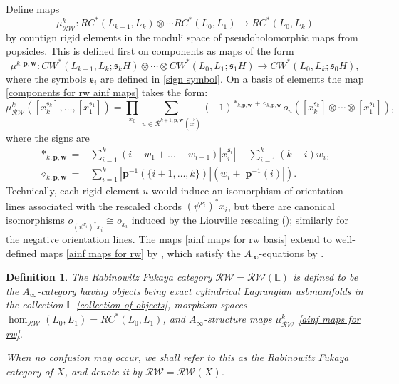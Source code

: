 \documentclass[11pt]{amsproc}
\def\L{{\mathbb L}}
\def\cR{\mathcal{R}}
\def\rw{\mathcal{RW}}
\def\ainf{A_\infty}
\def\sk{\mathfrak{s}}
\newtheorem{defn}[lem]{Definition}
\theoremstyle{remark}
\numberwithin{equation}{section}
\begin{document}
Define maps
\begin{equation}\label{ainf maps for rw}
\mu^{k}_{\rw}: RC^{*}(L_{k-1}, L_{k}) \otimes \cdots RC^{*}(L_{0}, L_{1}) \to RC^{*}(L_{0}, L_{k})
\end{equation}
by countign rigid elements in the moduli space of pseudoholomorphic maps from popsicles.
This is defined first on components as maps of the form
\begin{equation}\label{components for rw ainf maps}
\mu^{k, \mathbf{p}, \mathbf{w}}: CW^{*}(L_{k-1}, L_{k}; \sk_{k}H) \otimes \cdots \otimes CW^{*}(L_{0}, L_{1}; \sk_{1}H) \to CW^{*}(L_{0}, L_{k}; \sk_{0}H),
\end{equation}
where the symbols $\sk_{i}$ are defined in \eqref{sign symbol}.
On a basis of elements the map \eqref{components for rw ainf maps} takes the form:
\begin{equation}\label{ainf maps for rw basis}
\mu^{k}_{\rw}([x_{k}^{\sk_{k}}], \ldots, [x_{1}^{\sk_{1}}]) = \prod_{x_{0}} \sum_{u \in \cR^{k+1, \mathbf{p}, \mathbf{w}}(\vec{x})} (-1)^{*_{k, \mathbf{p}, \mathbf{w}} + \diamond_{k, \mathbf{p}, \mathbf{w}}} o_{u}([x_{k}^{\sk_{k}}] \otimes \cdots \otimes [x_{1}^{\sk_{1}}]),
\end{equation}
where the signs are
\begin{align}
*_{k, \mathbf{p}, \mathbf{w}} = & \sum_{i=1}^{k} (i + w_{1} + \ldots + w_{i-1}) |x_{i}^{\sk_{i}}| + \sum_{i=1}^{k} (k-i) w_{i}, \label{popsicle sign 1} \\
 \diamond_{k, \mathbf{p}, \mathbf{w}} = & \sum_{i=1}^{k} |\mathbf{p}^{-1}(\{i+1, \ldots, k\})|(w_{i} + |\mathbf{p}^{-1}(i)|). \label{popsicle sign 2}
\end{align}
Technically, each rigid element $u$ would induce an isomorphism of orientation lines associated with the rescaled chords $(\psi^{\nu_{i}})^{*}x_{i}$, but there are canonical isomorphisms $o_{(\psi^{\nu_{i}})^{*}x_{i}} \cong o_{x_{i}}$ induced by the Liouville rescaling (\cite{abouzaid_gc}); similarly for the negative orientation lines.
The maps \eqref{ainf maps for rw basis} extend to well-defined maps \eqref{ainf maps for rw} by \cite[Lemma 4.8]{GGV}, 
which satisfy the $\ainf$-equations by \cite[Lemma 4.9]{GGV}.

\begin{defn}
The Rabinowitz Fukaya category $\rw = \rw(\L)$ is defined to be the $\ainf$-category having objects being exact cylindrical Lagrangian usbmanifolds in the collection $\L$ \eqref{collection of objects},
morphism spaces $\hom_{\rw}(L_{0}, L_{1}) = RC^{*}(L_{0}, L_{1})$,
and $\ainf$-structure maps $\mu^{k}_{\rw}$ \eqref{ainf maps for rw}.

When no confusion may occur, we shall refer to this as the Rabinowitz Fukaya category of $X$,
and denote it by $\rw = \rw(X)$.
\end{defn}
\end{document}
